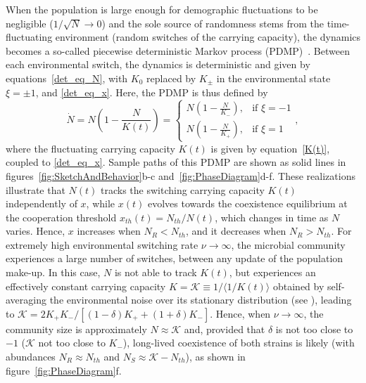 \documentclass{article}
\begin{document}
When the population is large enough for demographic fluctuations to be negligible (\(1/\sqrt{N}\to 0\)) and the sole source of randomness stems from the time-fluctuating environment (random switches of the carrying capacity), the dynamics becomes a so-called piecewise deterministic Markov process (PDMP)~\cite{PDMP}. Between each environmental switch, the dynamics is deterministic and given by equations~\eqref{det_eq_N}, with $K_0$ replaced by $K_{\pm}$ in the environmental state $\xi=\pm 1$, and \eqref{det_eq_x}. Here, the PDMP is thus defined by
\begin{equation}
    \dot{N}=N\left(1-\frac{N}{K(t)}\right)=\begin{cases}
                                            N\left(1-\frac{N}{K_-}\right), & \text{if $\xi=-1$} \\
                                            N\left(1-\frac{N}{K_+}\right), & \text{if $\xi=1$}
                                           \end{cases}
, \label{PDMP_N}
\end{equation}
%
where the fluctuating carrying capacity \(K(t)\) is given by equation~\eqref{K(t)}, coupled to \eqref{det_eq_x}. Sample paths of this PDMP are shown as solid lines in figures~\ref{fig:SketchAndBehavior}b-c and~\ref{fig:PhaseDiagram}d-f. These realizations illustrate that \(N(t)\) tracks the switching carrying capacity \(K(t)\) independently of \(x\), while \(x(t)\) evolves towards the coexistence equilibrium at the cooperation threshold \(x_{th}(t)=N_{th}/N(t)\), which changes in time as \(N\) varies. Hence, $x$ increases when $N_R<N_{th}$, and it decreases when $N_R>N_{th}$. For extremely high environmental switching rate \(\nu\to\infty\), the microbial community experiences a large number of switches, between any update of the population make-up. In this case, \(N\) is not able to track $K(t)$, but experiences an effectively constant carrying capacity \(K=\mathcal{K}\equiv1/\langle 1/K(t)\rangle\) obtained by self-averaging the environmental noise over its stationary distribution (see \cite{wienand2017evolution,wienand2018eco,west2020,Shibasaki2021,taitelbaum2023evolutionary}), leading to \(\mathcal{K}=2K_+K_-/[(1-\delta)K_++(1+\delta)K_-]\). Hence, when $\nu\to\infty$, the community size is approximately $N\approx \mathcal{K}$ and, provided that $\delta$ is not too close to $-1$ (\(\mathcal{K}\) not too close to \(K_-\)), long-lived coexistence of both strains is likely (with abundances $N_R\approx N_{th}$ and $N_S\approx\mathcal{K}- N_{th}$), as shown in figure~\ref{fig:PhaseDiagram}f.
\end{document}

